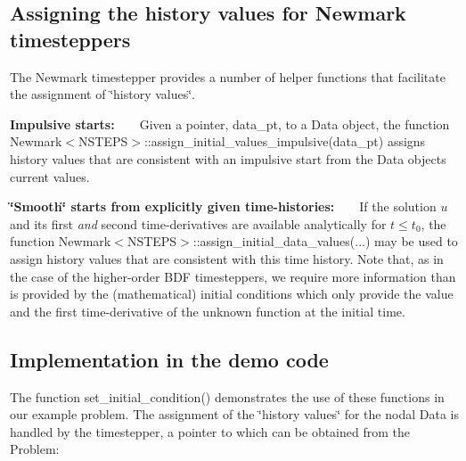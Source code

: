 \hypertarget{index_ic_for_newmark}{}\subsection{Assigning the history values for Newmark timesteppers}\label{index_ic_for_newmark}
The {\ttfamily Newmark} timestepper provides a number of helper functions that facilitate the assignment of \char`\"{}history values\char`\"{}.
\begin{DoxyEnumerate}
\item {\bfseries Impulsive starts\+: } ~\newline
~\newline
 Given a pointer, {\ttfamily data\+\_\+pt}, to a {\ttfamily Data} object, the function {\ttfamily Newmark$<$\+N\+S\+T\+E\+P\+S$>$\+::assign\+\_\+initial\+\_\+values\+\_\+impulsive(data\+\_\+pt)} assigns history values that are consistent with an impulsive start from the {\ttfamily Data} object\textquotesingle{}s current values.
\item {\bfseries \char`\"{}\+Smooth\char`\"{} starts from explicitly given time-\/histories\+: } ~\newline
~\newline
 If the solution $ u $ and its first {\itshape and} second time-\/derivatives are available analytically for $ t \le t_0$, the function {\ttfamily Newmark$<$\+N\+S\+T\+E\+P\+S$>$\+::assign\+\_\+initial\+\_\+data\+\_\+values}(...) may be used to assign history values that are consistent with this time history. Note that, as in the case of the higher-\/order {\ttfamily B\+DF} timesteppers, we require more information than is provided by the (mathematical) initial conditions which only provide the value and the first time-\/derivative of the unknown function at the initial time.
\end{DoxyEnumerate}

\hypertarget{index_implement_ic}{}\subsection{Implementation in the demo code}\label{index_implement_ic}
The function {\ttfamily set\+\_\+initial\+\_\+condition()} demonstrates the use of these functions in our example problem. The assignment of the \char`\"{}history values\char`\"{} for the nodal {\ttfamily Data} is handled by the timestepper, a pointer to which can be obtained from the {\ttfamily Problem\+:} 


